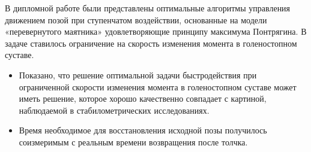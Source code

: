 \documentclass[a4paper,12pt, openany]{book}
\theoremstyle{plain} %
\theoremstyle{definition} %
\theoremstyle{remark} %
\numberwithin{equation}{chapter}
\begin{document}
{В дипломной работе были представлены оптимальные алгоритмы управления
движением позой при ступенчатом воздействии, основанные на модели
«перевернутого маятника» удовлетворяющие принципу максимума Понтрягина.
В задаче ставилось ограничение на скорость изменения момента в голеностопном суставе.
\begin{itemize}
    \item Показано, что решение оптимальной задачи быстродействия при ограниченной скорости изменения момента в голеностопном суставе может иметь решение, которое хорошо качественно совпадает с картиной, наблюдаемой в стабилометрических исследованиях.
    \item Время необходимое для восстановления исходной позы получилось соизмеримым с реальным времени возвращения после толчка.
\end{itemize}




\newpage


}
\end{document}
